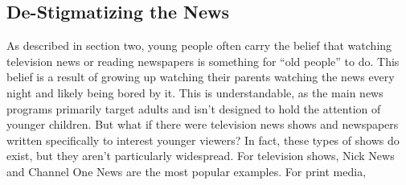 \documentclass[12pt,letterpaper]{article}
\begin{document}
\subsection{De-Stigmatizing the News}
As described in section two, young people often carry the belief that
watching television news or reading newspapers is something for ``old
people'' to do.  This belief is a result of growing up watching their
parents watching the news every night and likely being bored by it.
This is understandable, as the main news programs primarily target
adults and isn't designed to hold the attention of younger children.
But what if there were television news shows and newspapers written
specifically to interest younger viewers?  In fact, these types of
shows do exist, but they aren't particularly widespread. For
television shows, Nick News and Channel One News are the most popular
examples.  For print media, 
\end{document}
